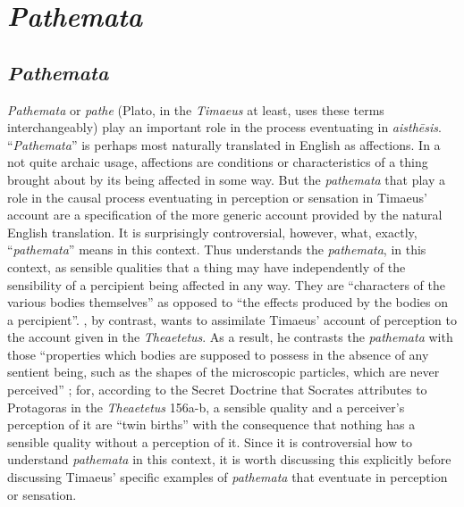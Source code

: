 
\chapter{\emph{Pathemata}} %
\label{cha:pathemata}

\section{\emph{Pathemata}} %
\label{sec:pathemata}

\emph{Pathemata} or \emph{pathe} (Plato, in the \emph{Timaeus} at least, uses these terms interchangeably) play an important role in the process eventuating in \emph{aisthēsis}. ``\emph{Pathemata}'' is perhaps most naturally translated in English as affections. In a not quite archaic usage, affections are conditions or characteristics of a thing brought about by its being affected in some way. But the \emph{pathemata} that play a role in the causal process eventuating in perception or sensation in Timaeus' account are a specification of the more generic account provided by the natural English translation. It is surprisingly controversial, however, what, exactly, ``\emph{pathemata}'' means in this context. Thus \citet[429-31]{Taylor:1928qb} understands the \emph{pathemata}, in this context, as sensible qualities that a thing may have independently of the sensibility of a percipient being affected in any way. They are ``characters of the various bodies themselves'' as opposed to ``the effects produced by the bodies on a percipient''. \citet[258-9]{Cornford:1935fk}, by contrast, wants to assimilate Timaeus' account of perception to the account given in the \emph{Theaetetus}. As a result, he contrasts the \emph{pathemata} with those ``properties which bodies are supposed to possess in the absence of any sentient being, such as the shapes of the microscopic particles, which are never perceived'' \citep[259]{Cornford:1935fk}; for, according to the Secret Doctrine that Socrates attributes to Protagoras in the \emph{Theaetetus} 156a-b, a sensible quality and a perceiver's perception of it are ``twin births'' with the consequence that nothing has a sensible quality without a perception of it. Since it is controversial how to understand \emph{pathemata} in this context, it is worth discussing this explicitly before discussing Timaeus' specific examples of \emph{pathemata} that eventuate in perception or sensation.

